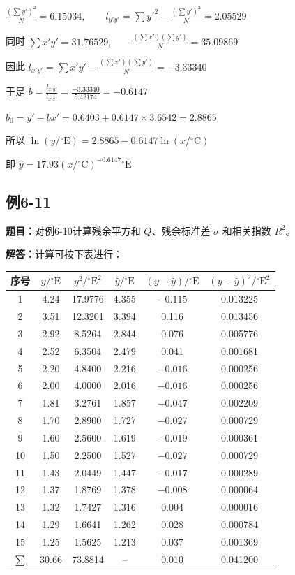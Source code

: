 \documentclass[UTF8,zihao=-4]{ctexart}
\newcommand{\problem}[1]{\subsection*{#1}}
\newcommand{\timu}{\noindent\textbf{题目：}}
\newcommand{\jieda}{\noindent\textbf{解答：}}
\begin{document}
$\frac{(\sum y')^2}{N}=6.15034, \qquad l_{y'y'}=\sum y'^2-\frac{(\sum y')^2}{N}=2.05529$

同时 $\sum x'y'=31.76529, \qquad \frac{(\sum x')(\sum y')}{N}=35.09869$

因此 $l_{x'y'} = \sum x'y'-\frac{(\sum x')(\sum y')}{N} = -3.33340$

于是 $b = \frac{l_{x'y'}}{l_{x'x'}} = \frac{-3.33340}{5.42174} = -0.6147$

$b_0 = \bar{y}'-b\bar{x}' = 0.6403+0.6147\times3.6542 = 2.8865$

所以 $\ln(y/{}^\circ\mathrm{E}) = 2.8865-0.6147\ln(x/{}^\circ\mathrm{C})$

即 $\hat{y} = 17.93(x/{}^\circ\mathrm{C})^{-0.6147}{}^\circ\mathrm{E}$

\problem{例6-11}

\timu 对例6-10计算残余平方和 $Q$、残余标准差 $\sigma$ 和相关指数 $R^2$。

\jieda 计算可按下表进行：

\begin{center}
\scriptsize
\setlength{\tabcolsep}{5pt}
\begin{tabular}{c|c|c|c|c|c}
\toprule
序号 & $y/{}^\circ\mathrm{E}$ & $y^2/{}^\circ\mathrm{E}^2$ & $\hat{y}/{}^\circ\mathrm{E}$ & $(y-\hat{y})/{}^\circ\mathrm{E}$ & $(y-\hat{y})^2/{}^\circ\mathrm{E}^2$\\
\midrule
1  & 4.24 & 17.9776 & 4.355 & $-0.115$ & 0.013225\\
2  & 3.51 & 12.3201 & 3.394 & 0.116 & 0.013456\\
3  & 2.92 & 8.5264  & 2.844 & 0.076 & 0.005776\\
4  & 2.52 & 6.3504  & 2.479 & 0.041 & 0.001681\\
5  & 2.20 & 4.8400  & 2.216 & $-0.016$ & 0.000256\\
6  & 2.00 & 4.0000  & 2.016 & $-0.016$ & 0.000256\\
7  & 1.81 & 3.2761  & 1.857 & $-0.047$ & 0.002209\\
8  & 1.70 & 2.8900  & 1.727 & $-0.027$ & 0.000729\\
9  & 1.60 & 2.5600  & 1.619 & $-0.019$ & 0.000361\\
10 & 1.50 & 2.2500  & 1.527 & $-0.027$ & 0.000729\\
11 & 1.43 & 2.0449  & 1.447 & $-0.017$ & 0.000289\\
12 & 1.37 & 1.8769  & 1.378 & $-0.008$ & 0.000064\\
13 & 1.32 & 1.7427  & 1.316 & 0.004 & 0.000016\\
14 & 1.29 & 1.6641  & 1.262 & 0.028 & 0.000784\\
15 & 1.25 & 1.5625  & 1.213 & 0.037 & 0.001369\\
\midrule
$\sum$ & 30.66 & 73.8814 & -- & 0.010 & 0.041200\\
\bottomrule
\end{tabular}
\end{center}
\end{document}
